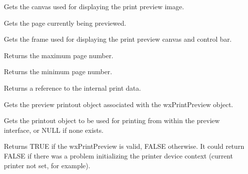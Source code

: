 

Gets the canvas used for displaying the print preview image.



Gets the page currently being previewed.



Gets the frame used for displaying the print preview canvas
and control bar.



Returns the maximum page number.



Returns the minimum page number.



Returns a reference to the internal print data.



Gets the preview printout object associated with the wxPrintPreview object.



Gets the printout object to be used for printing from within the preview interface,
or NULL if none exists.



Returns TRUE if the wxPrintPreview is valid, FALSE otherwise. It could return FALSE if there was a
problem initializing the printer device context (current printer not set, for example).



